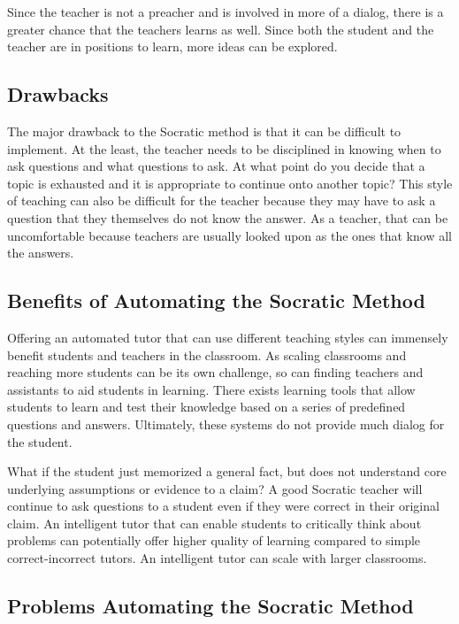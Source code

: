 \documentclass{sigchi}
\begin{document}
  Since the teacher is not a preacher and is involved in more of a dialog, there is a greater chance that the teachers learns as well. Since both the student and the teacher are in positions to learn, more ideas can be explored.
  
  \subsection{Drawbacks}
  The major drawback to the Socratic method is that it can be difficult to implement. At the least, the teacher needs to be disciplined in knowing when to ask questions and what questions to ask. At what point do you decide that a topic is exhausted and it is appropriate to continue onto another topic? This style of teaching can also be difficult for the teacher because they may have to ask a question that they themselves do not know the answer. As a teacher, that can be uncomfortable because teachers are usually looked upon as the ones that know all the answers.

  \subsection{Benefits of Automating the Socratic Method}
  Offering an automated tutor that can use different teaching styles can immensely benefit students and teachers in the classroom. As scaling classrooms and reaching more students can be its own challenge, so can finding teachers and assistants to aid students in learning. There exists learning tools that allow students to learn and test their knowledge based on a series of predefined questions and answers. Ultimately, these systems do not provide much dialog for the student.
  
  What if the student just memorized a general fact, but does not understand core underlying assumptions or evidence to a claim? A good Socratic teacher will continue to ask questions to a student even if they were correct in their original claim. An intelligent tutor that can enable students to critically think about problems can potentially offer higher quality of learning compared to simple correct-incorrect tutors. An intelligent tutor can scale with larger classrooms.

  \subsection{Problems Automating the Socratic Method}
\end{document}
